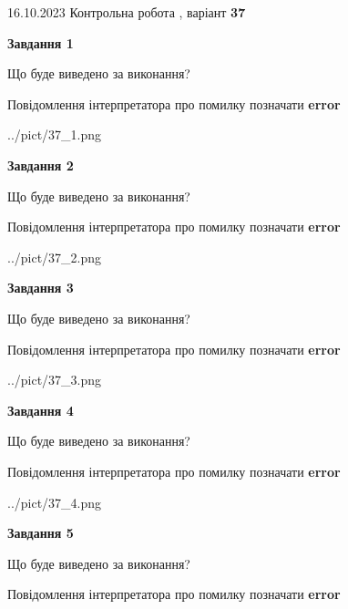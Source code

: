 \documentclass[12pt, ukrainian]{article}
\begin{document}
{\Large{16.10.2023 Контрольна робота , варіант  \No \textbf { 37 }\par}}
{
\begin {large}
{\begin {center}\textbf{Завдання 1}\end {center}}\par
Що буде виведено за виконання? \par
Повідомлення інтерпретатора про помилку позначати \textbf{error}

\begin{center}
	{../pict/37_1.png}
\end{center}
\newpage

{\begin {center}\textbf{Завдання 2}\end {center}}\par
Що буде виведено за виконання? \par
Повідомлення інтерпретатора про помилку позначати \textbf{error}

\begin{center}
	{../pict/37_2.png}
\end{center}
\newpage

{\begin {center}\textbf{Завдання 3}\end {center}}\par
Що буде виведено за виконання? \par
Повідомлення інтерпретатора про помилку позначати \textbf{error}

\begin{center}
	{../pict/37_3.png}
\end{center}
\newpage

{\begin {center}\textbf{Завдання 4}\end {center}}\par
Що буде виведено за виконання? \par
Повідомлення інтерпретатора про помилку позначати \textbf{error}

\begin{center}
	{../pict/37_4.png}
\end{center}
\newpage

{\begin {center}\textbf{Завдання 5}\end {center}}\par
Що буде виведено за виконання? \par
Повідомлення інтерпретатора про помилку позначати \textbf{error}


\end{large}}
\end{document}
